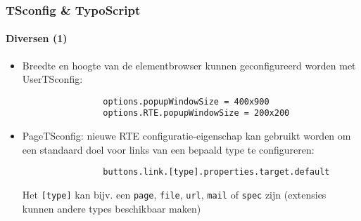 \begin{frame}[fragile]
	\frametitle{TSconfig \& TypoScript}
	\framesubtitle{Diversen (1)}

	\begin{itemize}
		\item Breedte en hoogte van de elementbrowser kunnen geconfigureerd worden met UserTSconfig:

			\begin{lstlisting}
				options.popupWindowSize = 400x900
				options.RTE.popupWindowSize = 200x200
			\end{lstlisting}


		\item PageTSconfig: nieuwe RTE configuratie-eigenschap kan gebruikt worden om een standaard doel voor links van een bepaald type te configureren:

			\begin{lstlisting}
				buttons.link.[type].properties.target.default
			\end{lstlisting}

			Het \texttt{[type]} kan bijv. een \texttt{page}, \texttt{file}, \texttt{url}, \texttt{mail} of \texttt{spec} zijn\newline
			(extensies kunnen andere types beschikbaar maken)

	\end{itemize}

\end{frame}


